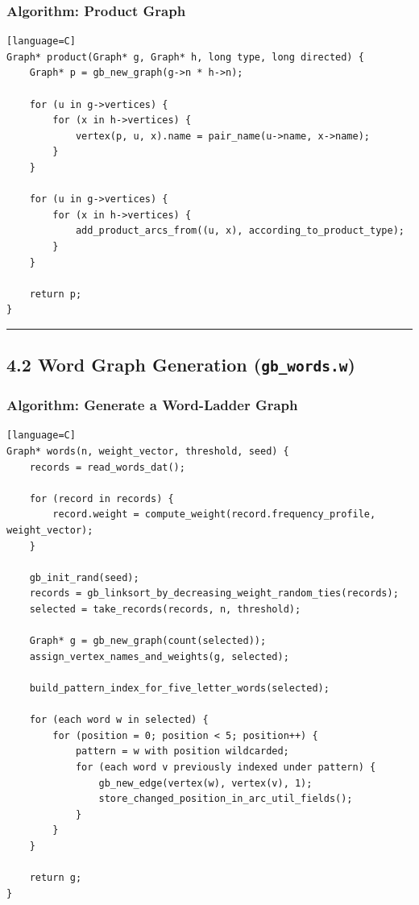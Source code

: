 \documentclass[11pt]{article}
\begin{document}
\subsubsection{Algorithm: Product Graph}\label{algorithm-product-graph}

\begin{verbatim}[language=C]
Graph* product(Graph* g, Graph* h, long type, long directed) {
    Graph* p = gb_new_graph(g->n * h->n);

    for (u in g->vertices) {
        for (x in h->vertices) {
            vertex(p, u, x).name = pair_name(u->name, x->name);
        }
    }

    for (u in g->vertices) {
        for (x in h->vertices) {
            add_product_arcs_from((u, x), according_to_product_type);
        }
    }

    return p;
}
\end{verbatim}

\begin{center}\rule{0.5\linewidth}{0.5pt}\end{center}

\subsection{\texorpdfstring{4.2 Word Graph Generation (\texttt{gb\_words.w})}{4.2 Word Graph Generation (gb\_words.w)}}\label{word-graph-generation-gb_words.w}

\subsubsection{Algorithm: Generate a Word-Ladder Graph}\label{algorithm-generate-a-word-ladder-graph}

\begin{verbatim}[language=C]
Graph* words(n, weight_vector, threshold, seed) {
    records = read_words_dat();

    for (record in records) {
        record.weight = compute_weight(record.frequency_profile, weight_vector);
    }

    gb_init_rand(seed);
    records = gb_linksort_by_decreasing_weight_random_ties(records);
    selected = take_records(records, n, threshold);

    Graph* g = gb_new_graph(count(selected));
    assign_vertex_names_and_weights(g, selected);

    build_pattern_index_for_five_letter_words(selected);

    for (each word w in selected) {
        for (position = 0; position < 5; position++) {
            pattern = w with position wildcarded;
            for (each word v previously indexed under pattern) {
                gb_new_edge(vertex(w), vertex(v), 1);
                store_changed_position_in_arc_util_fields();
            }
        }
    }

    return g;
}
\end{verbatim}
\end{document}
